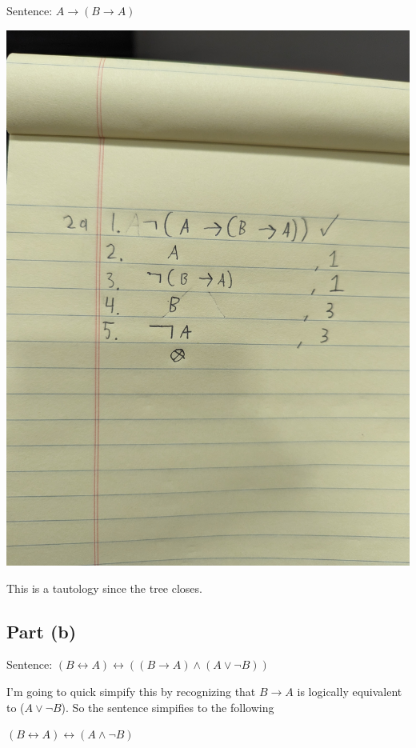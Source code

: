 \documentclass[12pt]{article}
\begin{document}
Sentence: $A \rightarrow (B \rightarrow A)$

\includegraphics[width=\textwidth]{2a}

This is a tautology since the tree closes.

\subsection*{Part (b)}

Sentence: $(B \leftrightarrow A) \leftrightarrow ((B \rightarrow A) \land (A \lor \lnot B))$

I'm going to quick simpify this by recognizing that $B \rightarrow A$ is logically equivalent to ($A \lor \lnot B$). So the sentence simpifies to the following

$(B \leftrightarrow A) \leftrightarrow (A \land \lnot B)$
\end{document}
